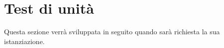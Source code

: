 \section{Test di unità}
Questa sezione verrà sviluppata in seguito quando sarà richiesta la sua istanziazione.
